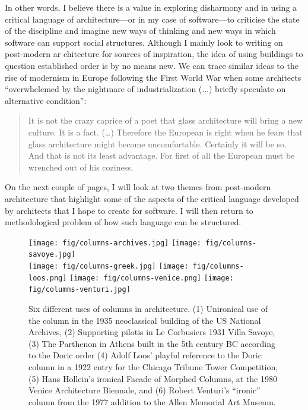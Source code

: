 In other words, I believe there is a value in exploring disharmony and in using a critical language of architecture---or in my case of software---to
criticise the state of the discipline and imagine new ways of thinking and new ways in which
software can support social structures. Although I mainly look to writing on post-modern ar
chitecture for sources of inspiration, the idea of using buildings to question established order
is by no means new. We can trace similar ideas to the rise of modernism in Europe following
the First World War when some architects ``overwhelemed by the nightmare of industrialization
(...) briefly speculate on alternative condition'':

\begin{quote}
It is not the crazy caprice of a poet that glass architecture will bring a new culture.
It is a fact. (\ldots) Therefore the European is right when he fears that glass architecture
might become uncomfortable. Certainly it will be so. And that is not its least advantage.
For first of all the European must be wrenched out of his coziness.
\end{quote}

On the next couple of pages, I will look at two themes from post-modern architecture that
highlight some of the aspects of the critical language developed by architects that I hope
to create for software. I will then return to methodological problem of how such language
can be structured.


\begin{figure}[t]
\vspace{-1em}
\texttt{[image: fig/columns-archives.jpg]}\quad
\texttt{[image: fig/columns-savoye.jpg]}\quad\\[1em]
\texttt{[image: fig/columns-greek.jpg]}\quad
\texttt{[image: fig/columns-loos.png]}\quad
\texttt{[image: fig/columns-venice.png]}\quad
\texttt{[image: fig/columns-venturi.jpg]}
\caption{Six different uses of columns in architecture. (1) Unironical use of the column in the 1935
neoclassical building of the US National Archives, (2) Supporting pilotis in Le Corbusiers 1931
Villa Savoye, (3) The Parthenon in Athens built in the 5th century BC according to the Doric order
(4) Adolf Loos' playful reference to the Doric column in a 1922 entry for the Chicago Tribune
Tower Competition, (5) Hans Hollein's ironical Facade of Morphed Columns, at the 1980 Venice
Architecture Biennale, and (6) Robert Venturi's ``ironic'' column from the 1977 addition to the
Allen Memorial Art Museum.}
\label{fig:columns}
\vspace{-1em}
\end{figure}

